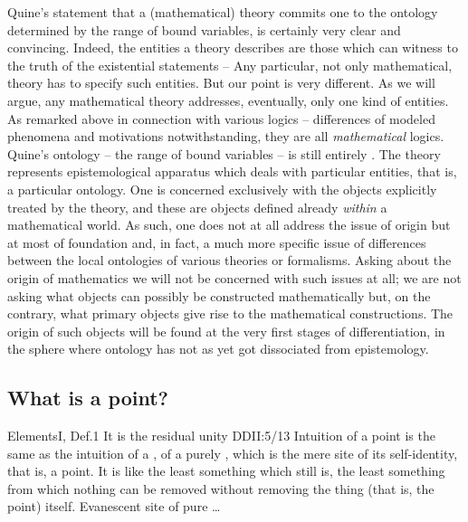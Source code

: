 Quine's statement that a (mathematical) theory commits one to the ontology
determined by the range of bound variables, is certainly very clear and
convincing.  Indeed, the entities a theory describes are those which can witness
to the truth of the existential statements --  Any particular, not only mathematical, theory has to specify such
entities.  But our point is very different. As we will argue, any mathematical
theory addresses, eventually, only one kind of entities.  As remarked above in
connection with various logics -- differences of modeled phenomena and
motivations notwithstanding, they are all {\em mathematical} logics.  Quine's
ontology -- the range of bound variables -- is still entirely
. The theory represents epistemological apparatus which deals
with particular entities, that is, a particular ontology. One is concerned
exclusively with the objects explicitly treated by the theory, and these are
objects defined already {\em within} a mathematical world. As such, one does not
at all address the issue of origin but at most of foundation and, in fact, a
much more specific issue of differences between the local ontologies of various
theories or formalisms.  Asking about the origin of mathematics we will not be
concerned with such issues at all; we are not asking what objects can possibly
be constructed mathematically but, on the contrary, what primary objects give
rise to the mathematical constructions. The origin of such objects will
be found at the very first stages of differentiation, in the sphere where
ontology has not as yet got dissociated from epistemology.


\subsection{What is a point?} %
\pa\label{pa:pointA} \citet{A point is that which has no part.}{Elements}{I,
  Def.1} It is the residual unity \citet{beyond which there cannot be anything
  less.}{DDI}{I:5/13} Intuition of a point is the same as the intuition of a
, of a purely , which is the mere site of its
self-identity, that is, a point.  It is like the least something which still is,
the least something from which nothing can be removed without removing the thing
(that is, the point) itself. Evanescent site of pure \ldots

